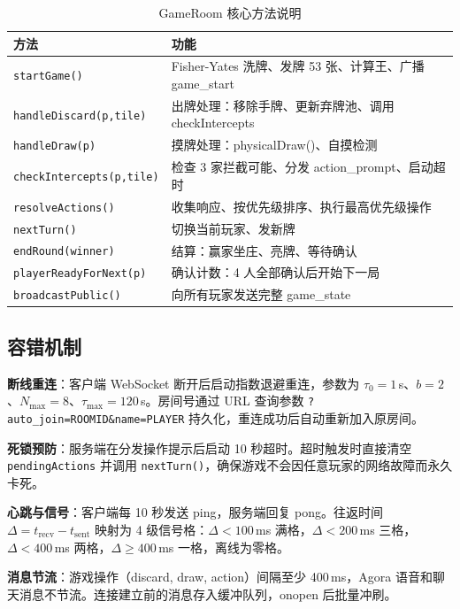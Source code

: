 \documentclass[11pt,a4paper]{article}
\begin{document}
\begin{table}[H]
\centering
\caption{GameRoom 核心方法说明}
\label{tab:methods}
\small
\begin{tabular}{@{}ll@{}}
\toprule
\textbf{方法} & \textbf{功能} \\
\midrule
\texttt{startGame()} & Fisher-Yates 洗牌、发牌 53 张、计算王、广播 game\_start \\
\texttt{handleDiscard(p,tile)} & 出牌处理：移除手牌、更新弃牌池、调用 checkIntercepts \\
\texttt{handleDraw(p)} & 摸牌处理：physicalDraw()、自摸检测 \\
\texttt{checkIntercepts(p,tile)} & 检查 3 家拦截可能、分发 action\_prompt、启动超时 \\
\texttt{resolveActions()} & 收集响应、按优先级排序、执行最高优先级操作 \\
\texttt{nextTurn()} & 切换当前玩家、发新牌 \\
\texttt{endRound(winner)} & 结算：赢家坐庄、亮牌、等待确认 \\
\texttt{playerReadyForNext(p)} & 确认计数：4 人全部确认后开始下一局 \\
\texttt{broadcastPublic()} & 向所有玩家发送完整 game\_state \\
\bottomrule
\end{tabular}
\end{table}

\subsection{容错机制}

\textbf{断线重连}：客户端 WebSocket 断开后启动指数退避重连，参数为 $\tau_0 = 1$\,s、$b = 2$、$N_{\max} = 8$、$\tau_{\max} = 120$\,s。房间号通过 URL 查询参数 \texttt{?auto\_join=ROOMID\&name=PLAYER} 持久化，重连成功后自动重新加入原房间。

\textbf{死锁预防}：服务端在分发操作提示后启动 10 秒超时。超时触发时直接清空 \texttt{pendingActions} 并调用 \texttt{nextTurn()}，确保游戏不会因任意玩家的网络故障而永久卡死。

\textbf{心跳与信号}：客户端每 10 秒发送 ping，服务端回复 pong。往返时间 $\Delta = t_{\text{recv}} - t_{\text{sent}}$ 映射为 4 级信号格：$\Delta < 100$\,ms 满格，$\Delta < 200$\,ms 三格，$\Delta < 400$\,ms 两格，$\Delta \geq 400$\,ms 一格，离线为零格。

\textbf{消息节流}：游戏操作（discard, draw, action）间隔至少 400\,ms，Agora 语音和聊天消息不节流。连接建立前的消息存入缓冲队列，onopen 后批量冲刷。
\end{document}
